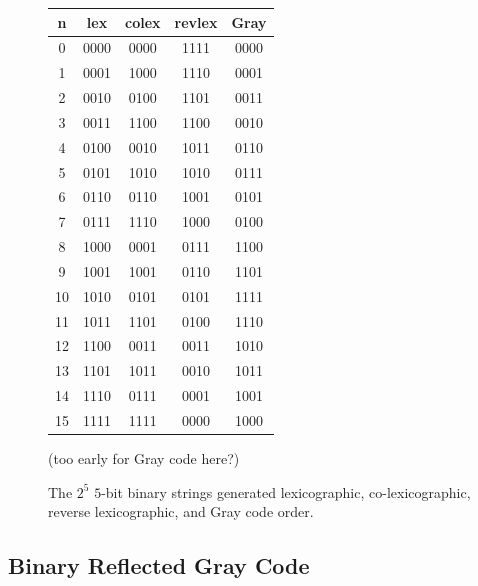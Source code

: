 \begin{figure}[]

\begin{center}
\begin{tabular}{ |c|c|c|c|c| } 
 \hline


n &  lex  & colex & revlex & Gray \\  
\hline
0 & 0000 & 0000 & 1111 & 0000 \\
1 & 0001 & 1000 & 1110 & 0001 \\
2 & 0010 & 0100 & 1101 & 0011 \\
3 & 0011 & 1100 & 1100 & 0010 \\
4 & 0100 & 0010 & 1011 & 0110 \\
5 & 0101 & 1010 & 1010 & 0111 \\
6 & 0110 & 0110 & 1001 & 0101 \\
7 & 0111 & 1110 & 1000 & 0100 \\
8 & 1000 & 0001 & 0111 & 1100 \\
9 & 1001 & 1001 & 0110 & 1101 \\
10 & 1010 & 0101 & 0101 & 1111 \\
11 & 1011 & 1101 & 0100 & 1110 \\
12 & 1100 & 0011 & 0011 & 1010 \\
13 & 1101 & 1011 & 0010 & 1011 \\
14 & 1110 & 0111 & 0001 & 1001 \\
15 & 1111 & 1111 & 0000 & 1000 \\

\hline

\end{tabular}

    (too early for Gray code here?)
\end{center}
        \caption{The $2^5$ $5$-bit binary strings generated lexicographic, co-lexicographic, reverse lexicographic, and Gray code order.}
        \label{fig:bintable}
\end{figure}


\subsection{Binary Reflected Gray Code}

